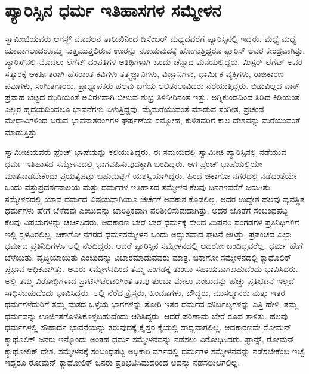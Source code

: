 
\chapter{ಪ್ಯಾರಿಸ್ಸಿನ ಧರ್ಮ ಇತಿಹಾಸಗಳ ಸಮ್ಮೇಳನ }

 ಸ್ವಾಮೀಜಿಯವರು ಆಗಸ್ಟ್ ಮೊದಲನೆ ತಾರೀಖಿನಿಂದ ಡಿಸೆಂಬರ್ ಮಧ್ಯದವರೆಗೆ ಪ್ಯಾರಿಸ್ಸಿನಲ್ಲಿ ಇದ್ದರು. ಮಧ್ಯೆ ಮಧ್ಯೆ ಯಾವಾಗಲಾದರೊಮ್ಮೆ ಸುತ್ತಮುತ್ತಲಿರುವ ಊರನ್ನು ನೋಡುವುದಕ್ಕೆ ಹೋಗುತ್ತಿದ್ದರೂ ಪ್ಯಾರಿಸ್ ಅವರ ಕೇಂದ್ರವಾಗಿತ್ತು. ಪ್ಯಾರಿಸ್‍ನಲ್ಲಿ ಮೊದಲು ಲೆಗೆಟ್ ದಂಪತಿಗಳ ಅತಿಥಿಗಳಾಗಿ ಒಂದು ಚೆನ್ನಾದ ಮನೆಯಲ್ಲಿದ್ದರು. ಮಿಸ್ಟರ್ ಲೆಗೆಟ್ ಅವರ ಸತ್ಕಾರಕ್ಕೆ ಆಕರ್ಷಿತರಾಗಿ ಹೆಸರಾಂತ ಕವಿಗಳು ತತ್ತ್ವಜ್ಞಾನಿಗಳು, ವಿಜ್ಞಾನಿಗಳು, ಧಾರ್ಮಿಕ ವ್ಯಕ್ತಿಗಳು, ರಾಜಕಾರಣ ಪಟುಗಳು, ಸಂಗೀತಗಾರರು, ಪ್ರಾಧ್ಯಾಪಕರು ಹಲವು ಬಗೆಯ ಲಲಿತಕಲಾವಿದರು ನೆರೆಯುತ್ತಿದ್ದರು. ಬಿಡುವಿಲ್ಲದ ವಾಕ್ ಪ್ರವಾಹ ಬೆಟ್ಟದ ಝರಿಯಂತೆ ಅವಿರಳವಾಗಿ ಬೀಳುವ ಶುಭ್ರ ತಿಳಿನೀರಿನಂತೆ ಇತ್ತು. ಅಗ್ನಿಕುಂಡದಿಂದ ಸಿಡಿದ ಕಿಡಿಯಂತೆ ಎಲ್ಲರ ಹೃದಯದಿಂದಲೂ ಭಾವನೆಗಳು ಏಳುತ್ತಿದ್ದವು. ಮೈಮರೆಯುವಂತೆ ಮಾಡುವ ಸಂಗೀತ, ಪ್ರಚಂಡ ಮೇಧಾವಿಗಳಿಂದ ಬರುವ ಭಾವನಾತರಂಗಗಳ ಘರ್ಷಣೆಯ ಸಮ್ಮೋಹ, ಕುಳಿತವರಿಗೆ ಕಾಲ ದೇಶವನ್ನು ಮರೆಯುವಂತೆ ಮಾಡುತ್ತಿತ್ತು. 

 ಸ್ವಾಮೀಜಿಯವರು ಫ್ರೆಂಚ್ ಭಾಷೆಯನ್ನು ಕಲಿಯುತ್ತಿದ್ದರು. ಈ ಸಮಯದಲ್ಲಿ ಸ್ವಾಮೀಜಿ ಪ್ಯಾರಿಸ್ಸಿನಲ್ಲಿ ನಡೆಯುವ ಧರ್ಮ ಇತಿಹಾಸದ ಸಮ್ಮೇಳನದಲ್ಲಿ ಭಾಗವಹಿಸುವುದಕ್ಕಾಗಿ ಬಂದಿದ್ದರು. ಆಗ ಫ್ರೆಂಚ್ ಭಾಷೆಯಲ್ಲಿಯೇ ಮಾತನಾಡಬೇಕೆಂದು ಪ್ರಯತ್ನಪಟ್ಟು ಬಹುಮಟ್ಟಿಗೆ ಯಶಸ್ವಿಯಾಗಿದ್ದರು. ಹಿಂದೆ ಚಿಕಾಗೋ ನಗರದಲ್ಲಿ ನಡೆದಂತೆಯೇ ಒಂದು ವಸ್ತುಪ್ರದರ್ಶನಾಲಯ ಮತ್ತು ಧರ್ಮಗಳ ಇತಿಹಾಸದ ಸಮ್ಮೇಳನ ಕೆಲವು ದಿನಗಳವರೆಗೆ ಜರುಗಿತು. ಸಮ್ಮೇಳನದಲ್ಲಿ ಯಾವ ಧರ್ಮದ ವಿಷಯವಾಗಿಯೂ ಚರ್ಚೆಗೆ ಅವಕಾಶ ಕೊಡಲಿಲ್ಲ. ಅದರ ಉದ್ದೇಶ ಹಲವು ವ್ಯವಸ್ಥಿತ ಧರ್ಮಗಳು ಹೇಗೆ ಬೆಳೆದವು ಎಂಬುದನ್ನು ಚಾರಿತ್ರಿಕವಾಗಿ ಪರಿಶೀಲಿಸುವುದಾಗಿತ್ತು. ಅದರ ಜೊತೆಗೆ ಸಂಬಂಧಪಟ್ಟ ಕೆಲವು ವಿಷಯಗಳನ್ನು ಚರ್ಚಿಸಿದರು. ಆದಕಾರಣ ಬೇರೆ ಬೇರೆ ಧರ್ಮಕ್ಕೆ ಸೇರಿದ ಮಿಷನರಿ ಪಂಗಡಗಳ ಪ್ರತಿನಿಧಿಗಳಿಗೆ ಇಲ್ಲಿ ಸ್ಥಳವಿರಲಿಲ್ಲ. ಚಿಕಾಗೋ ನಗರದ ಧರ್ಮಸಮ್ಮೇಳನ ಒಂದು ಅದ್ಭುತವಾದ ಘಟನೆ ಆಗಿತ್ತು. ಪ್ರಪಂಚದ ಎಲ್ಲಾ ಧರ್ಮದ ಪ್ರತಿನಿಧಿಗಳೂ ಅಲ್ಲಿ ನೆರೆದಿದ್ದರು. ಆದರೆ ಪ್ಯಾರಿಸ್ಸಿನ ಸಮ್ಮೇಳನದಲ್ಲಿ ಆದರೋ ಬಂದಿದ್ದವರೆಲ್ಲ, ಧರ್ಮ ಹೇಗೆ ಬೆಳೆಯಿತು, ವೃದ್ಧಿಯಾಯಿತು ಎಂಬುದನ್ನು ವಿಚಾರಮಾಡುವವರು ಮಾತ್ರ. ಚಿಕಾಗೋ ಸಮ್ಮೇಳನದಲ್ಲಿ ಕ್ಯಾಥೊಲಿಕ್ ಪ್ರಭಾವ ಅಧಿಕವಾಗಿತ್ತು. ಅವರು ಸಮ್ಮೇಳನದಿಂದ ತಮ್ಮ ಪಂಗಡಕ್ಕೆ ತುಂಬಾ ಸಹಾಯವಾಗಬಹುದೆಂದು ಭಾವಿಸಿದರು. ಅಲ್ಲಿ ತಮ್ಮ ವಿರೋಧಿಗಳಾದ ಪ್ರಾಟಿಸ್‍ಟೆಂಟರಿಗಿಂತ ತಾವು ತುಂಬಾ ಮೇಲು ಎಂಬುದನ್ನು ಹೆಚ್ಚು ಪ್ರತಿಭಟನೆ ಇಲ್ಲದೆ ಸಾಧಿಸಬಹುದೆಂದು ಭಾವಿಸಿದ್ದರು. ಅಲ್ಲಿ ನೆರೆದ ಕ್ರೈಸ್ತರು, ಹಿಂದೂಗಳು, ಬೌದ್ಧರು, ಮುಸಲ್ಮಾನರು ಮತ್ತು ಇತರ ಧರ್ಮಗಳೆದುರಿಗೆ ತಮ್ಮ ಮತದ ಒಳ್ಳೆಯ ಭಾಗಗಳನ್ನು ತೋರಿ ಇತರ ಧರ್ಮದ ದೌರ್ಬಲ್ಯಗಳನ್ನು ಎತ್ತಿ ಹೇಳಿ, ತಮ್ಮ ಧರ್ಮವನ್ನು ಊರ್ಜಿತಗೊಳಿಸಿಕೊಳ್ಳಬಹುದೆಂದು ಆಶಿಸಿದ್ದರು. ಆದರೆ ಪರಿಣಾಮ ಬೇರೆ ರೂಪ ತಾಳಿತು. ಹಲವು ಧರ್ಮಗಳಲ್ಲಿ ಸೌಹಾರ್ದ ಭಾವನೆಯನ್ನು ತರುವುದಕ್ಕೆ ಕ್ರೈಸ್ತರ ಕೈಯಲ್ಲಿ ಸಾಧ್ಯವಾಗಲಿಲ್ಲ. ಆದಕಾರಣವೇ ರೋಮನ್ ಕ್ಯಾಥೊಲಿಕ್ ಜನರು ಇನ್ನೊಂದು ಅಂತಹ ಧರ್ಮ ಸಮ್ಮೇಳನವನ್ನು ನಡೆಸಲು ವಿರೋಧಿಸಿದರು. ಫ್ರಾನ್ಸ್, ರೋಮನ್ ಕ್ಯಾಥೋಲಿಕ್ ದೇಶ. ಸಮ್ಮೇಳನಕ್ಕೆ ಸಂಬಂಧಪಟ್ಟ ಅಧಿಕಾರಿ ವರ್ಗದಲ್ಲಿ ಧರ್ಮಗಳ ಸಮ್ಮೇಳನವನ್ನು ನಡೆಸಬೇಕೆಂಬ ಇಚ್ಛೆ ಇದ್ದರೂ ರೋಮನ್ ಕ್ಯಾಥೋಲಿಕ್ ಜನರು ಪ್ರತಿಭಟಿಸಿದುದರಿಂದ ಅದನ್ನು ನಡೆಸಲು\break ಆಗಲಿಲ್ಲ. 

